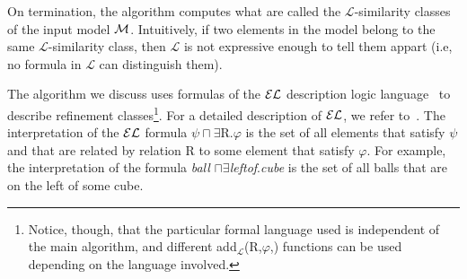 

On termination, the algorithm computes what are called the $\mathcal{L}$-similarity classes of the input model $\mathcal{M}$. Intuitively, if two elements in the model belong to the same $\mathcal{L}$-similarity class, then $\mathcal{L}$ is not expressive enough to tell them appart (i.e, no formula in $\mathcal{L}$ can distinguish them). 

The algorithm we discuss uses formulas of the $\mathcal{EL}$ description logic language~\cite{baad:desc03} to describe refinement classes\footnote{Notice, though, that the particular formal language used is independent of the main algorithm, and different add$_{\mathcal{L}}$(R,$\varphi$,\RE) functions can be used depending on the language involved.}. 
For a detailed description of $\mathcal{EL}$, we refer to~\cite{baad:desc03}.  
The interpretation of the $\mathcal{EL}$ formula $\psi \sqcap \exists$R.$\varphi$ is the set of all elements that satisfy $\psi$ and that are related by relation R to some element that satisfy $\varphi$. 
For example, the interpretation of the formula \emph{ball} $\sqcap \exists$\emph{leftof}.\emph{cube} is the set of all balls that are on the left of some cube.  





